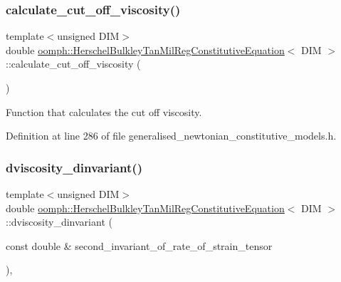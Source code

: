 \subsubsection{\texorpdfstring{calculate\+\_\+cut\+\_\+off\+\_\+viscosity()}{calculate\_cut\_off\_viscosity()}}
{\footnotesize\ttfamily template$<$unsigned D\+IM$>$ \\
double \hyperlink{classoomph_1_1HerschelBulkleyTanMilRegConstitutiveEquation}{oomph\+::\+Herschel\+Bulkley\+Tan\+Mil\+Reg\+Constitutive\+Equation}$<$ D\+IM $>$\+::calculate\+\_\+cut\+\_\+off\+\_\+viscosity (\begin{DoxyParamCaption}{ }\end{DoxyParamCaption})\hspace{0.3cm}{\ttfamily [inline]}}



Function that calculates the cut off viscosity. 



Definition at line 286 of file generalised\+\_\+newtonian\+\_\+constitutive\+\_\+models.\+h.

\mbox{\label{classoomph_1_1HerschelBulkleyTanMilRegConstitutiveEquation_a7b54c8c6374ba0bd80f5d51768701dc0}} 
\subsubsection{\texorpdfstring{dviscosity\+\_\+dinvariant()}{dviscosity\_dinvariant()}}
{\footnotesize\ttfamily template$<$unsigned D\+IM$>$ \\
double \hyperlink{classoomph_1_1HerschelBulkleyTanMilRegConstitutiveEquation}{oomph\+::\+Herschel\+Bulkley\+Tan\+Mil\+Reg\+Constitutive\+Equation}$<$ D\+IM $>$\+::dviscosity\+\_\+dinvariant (\begin{DoxyParamCaption}\item[{const double \&}]{second\+\_\+invariant\+\_\+of\+\_\+rate\+\_\+of\+\_\+strain\+\_\+tensor }\end{DoxyParamCaption})\hspace{0.3cm}{\ttfamily [inline]}, {\ttfamily [virtual]}}



